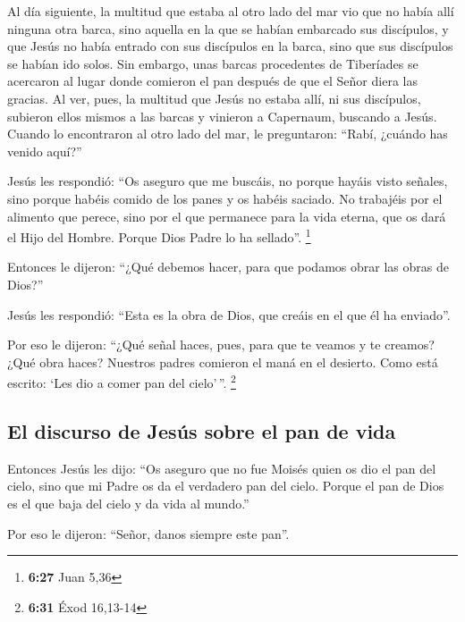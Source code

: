  Al día siguiente, la multitud que estaba al otro lado
del mar vio que no había allí ninguna otra barca, sino aquella en la que
se habían embarcado sus discípulos, y que Jesús no había entrado con sus
discípulos en la barca, sino que sus discípulos se habían ido solos.
 Sin embargo, unas barcas procedentes de Tiberíades se
acercaron al lugar donde comieron el pan después de que el Señor diera
las gracias.  Al ver, pues, la multitud que Jesús no
estaba allí, ni sus discípulos, subieron ellos mismos a las barcas y
vinieron a Capernaum, buscando a Jesús.  Cuando lo
encontraron al otro lado del mar, le preguntaron: ``Rabí, ¿cuándo has
venido aquí?''

 Jesús les respondió: ``Os aseguro que me buscáis, no
porque hayáis visto señales, sino porque habéis comido de los panes y os
habéis saciado.  No trabajéis por el alimento que perece,
sino por el que permanece para la vida eterna, que os dará el Hijo del
Hombre. Porque Dios Padre lo ha sellado''. \footnote{\textbf{6:27} Juan
  5,36}

 Entonces le dijeron: ``¿Qué debemos hacer, para que
podamos obrar las obras de Dios?''

 Jesús les respondió: ``Esta es la obra de Dios, que
creáis en el que él ha enviado''.

 Por eso le dijeron: ``¿Qué señal haces, pues, para que
te veamos y te creamos? ¿Qué obra haces?  Nuestros padres
comieron el maná en el desierto. Como está escrito: `Les dio a comer pan
del cielo'\,''. \footnote{\textbf{6:31} Éxod 16,13-14}

\hypertarget{el-discurso-de-jesuxfas-sobre-el-pan-de-vida}{%
\subsection{El discurso de Jesús sobre el pan de
vida}\label{el-discurso-de-jesuxfas-sobre-el-pan-de-vida}}

 Entonces Jesús les dijo: ``Os aseguro que no fue Moisés
quien os dio el pan del cielo, sino que mi Padre os da el verdadero pan
del cielo.  Porque el pan de Dios es el que baja del
cielo y da vida al mundo.''

 Por eso le dijeron: ``Señor, danos siempre este pan''.

